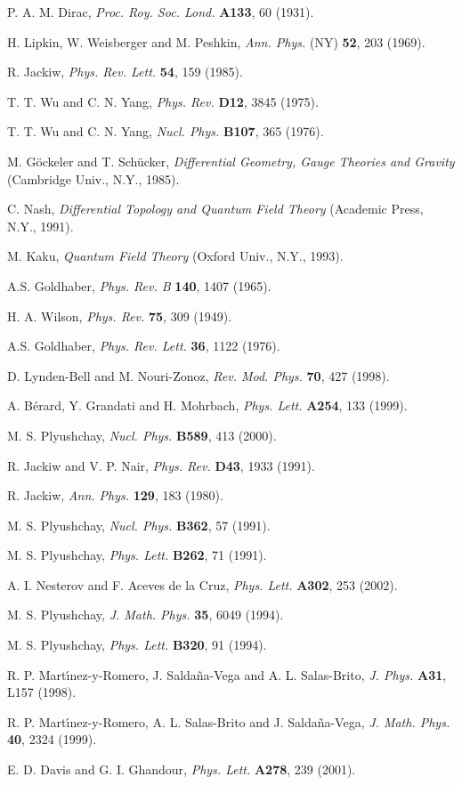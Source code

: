 \documentclass[a4paper,twocolumn,aps,showpacs,showkeys]{revtex4}
\begin{document}
\begin{thebibliography}{99}
 P. A. M. Dirac, {\it Proc. Roy. Soc. Lond.} {\bf A133}, 60 (1931).

 H. Lipkin, W. Weisberger and M. Peshkin, {\it Ann. Phys.}
(NY) {\bf 52}, 203 (1969).

 R. Jackiw, {\it Phys. Rev. Lett.} {\bf 54}, 159 (1985).

 T. T. Wu and C. N. Yang, {\it Phys. Rev.} {\bf D12}, 3845 (1975).

 T. T. Wu and C. N. Yang, {\it Nucl. Phys.} {\bf B107}, 365 (1976).

 M. G\"ockeler and T. Sch\"ucker, {\it Differential
Geometry, Gauge Theories and Gravity} (Cambridge Univ., N.Y., 1985).

 C. Nash, {\it Differential Topology and Quantum Field
Theory} (Academic Press, N.Y., 1991).

 M. Kaku, {\it Quantum Field Theory} (Oxford Univ., N.Y.,
1993).

 A.S. Goldhaber, {\it Phys. Rev. B} {\bf 140}, 1407 (1965).

 H. A. Wilson, {\it Phys. Rev.} {\bf 75}, 309 (1949).

 A.S. Goldhaber, {\it Phys. Rev. Lett.} {\bf 36}, 1122 (1976).

 D. Lynden-Bell and M. Nouri-Zonoz, {\it Rev. Mod. Phys.}
{\bf 70}, 427 (1998).

 A. B\'erard, Y. Grandati and H. Mohrbach, {\it Phys.
Lett.} {\bf A254}, 133 (1999).

 M. S. Plyushchay, {\it Nucl. Phys.} {\bf B589}, 413 (2000).

 R. Jackiw and V. P. Nair, {\it Phys. Rev.} {\bf D43}, 1933 (1991).

 R. Jackiw, {\it Ann. Phys.} {\bf 129}, 183 (1980).

 M. S. Plyushchay, {\it Nucl. Phys.} {\bf B362}, 57 (1991).

 M. S. Plyushchay, {\it Phys. Lett.} {\bf B262}, 71 (1991).

 A. I. Nesterov and F. Aceves de la Cruz, {\it Phys. Lett.} {\bf A302}, 253 (2002).

 M. S. Plyushchay, {\it J. Math. Phys.} {\bf 35}, 6049 (1994).

 M. S. Plyushchay, {\it Phys. Lett.} {\bf B320}, 91 (1994).

 R. P. Mart{\'\i}nez-y-Romero, J. Salda\~na-Vega and A. L.
Salas-Brito, {\it J. Phys.} {\bf A31}, L157 (1998).

 R. P. Mart{\'\i}nez-y-Romero, A. L. Salas-Brito and
J. Salda\~na-Vega, {\it J. Math. Phys.} {\bf 40}, 2324 (1999).

 E. D. Davis and G. I. Ghandour, {\it Phys. Lett.} {\bf
A278}, 239 (2001).

\end{thebibliography}
\end{document}
